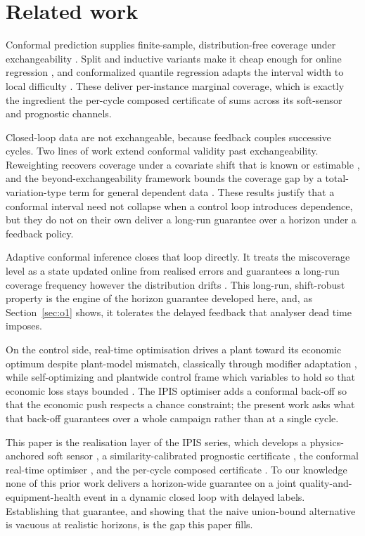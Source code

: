 \section{Related work}
\label{sec:related}

Conformal prediction supplies finite-sample, distribution-free coverage under exchangeability
\citep{vovk2005, shafer2008}. Split and inductive variants make it cheap enough for online
regression \citep{lei2018, angelopoulos2023}, and conformalized quantile regression adapts the
interval width to local difficulty \citep{romano2019}. These deliver per-instance marginal
coverage, which is exactly the ingredient the per-cycle composed certificate of
\citet{busico_m4} sums across its soft-sensor and prognostic channels.

Closed-loop data are not exchangeable, because feedback couples successive cycles. Two lines of
work extend conformal validity past exchangeability. Reweighting recovers coverage under a
covariate shift that is known or estimable \citep{tibshirani2019}, and the
beyond-exchangeability framework bounds the coverage gap by a total-variation-type term for
general dependent data \citep{barber2023}. These results justify that a conformal interval need
not collapse when a control loop introduces dependence, but they do not on their own deliver a
long-run guarantee over a horizon under a feedback policy.

Adaptive conformal inference closes that loop directly. It treats the miscoverage level as a
state updated online from realised errors and guarantees a long-run coverage frequency however
the distribution drifts \citep{gibbs2021}. This long-run, shift-robust property is the engine of
the horizon guarantee developed here, and, as Section~\ref{sec:o1} shows, it tolerates the
delayed feedback that analyser dead time imposes.

On the control side, real-time optimisation drives a plant toward its economic optimum despite
plant-model mismatch, classically through modifier adaptation
\citep{marchetti2009, chachuat2009}, while self-optimizing and plantwide control frame which
variables to hold so that economic loss stays bounded \citep{skogestad2000}. The IPIS optimiser
\citep{busico_m3} adds a conformal back-off so that the economic push respects a chance
constraint; the present work asks what that back-off guarantees over a whole campaign rather
than at a single cycle.

This paper is the realisation layer of the IPIS series, which develops a physics-anchored soft
sensor \citep{busico_m1}, a similarity-calibrated prognostic certificate \citep{busico_m2}, the
conformal real-time optimiser \citep{busico_m3}, and the per-cycle composed certificate
\citep{busico_m4}. To our knowledge none of this prior work delivers a horizon-wide guarantee on
a joint quality-and-equipment-health event in a dynamic closed loop with delayed labels.
Establishing that guarantee, and showing that the naive union-bound alternative is vacuous at
realistic horizons, is the gap this paper fills.
